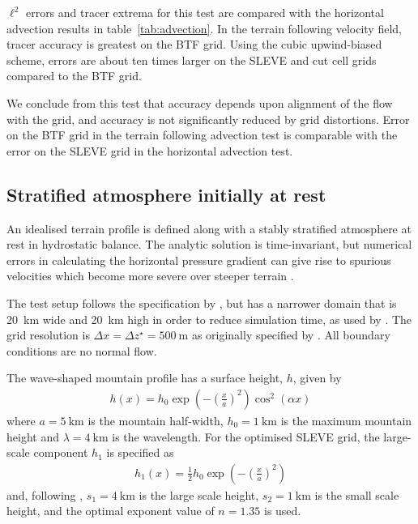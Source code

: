 \documentclass[twocol]{ametsoc}
\begin{document}
$\ell^2$ errors and tracer extrema for this test are compared with the horizontal advection results in table~\ref{tab:advection}.  In the terrain following velocity field, tracer accuracy is greatest on the BTF grid.  Using the cubic upwind-biased scheme, errors are about ten times larger on the SLEVE and cut cell grids compared to the BTF grid.

We conclude from this test that accuracy depends upon alignment of the flow with the grid, and accuracy is not significantly reduced by grid distortions.  Error on the BTF grid in the terrain following advection test is comparable with the error on the SLEVE grid in the horizontal advection test.

\subsection{Stratified atmosphere initially at rest}
\label{sec:resting}

An idealised terrain profile is defined along with a stably stratified atmosphere at rest in hydrostatic balance.  The analytic solution is time-invariant, but numerical errors in calculating the horizontal pressure gradient can give rise to spurious velocities which become more severe over steeper terrain \citep{klemp2011}.

The test setup follows the specification by \cite{klemp2011}, but has a narrower domain that is \SI{20}{\kilo\meter} wide and \SI{20}{\kilo\meter} high in order to reduce simulation time, as used by \citet{weller-shahrokhi2014}.  The grid resolution is \(\Delta x = \Delta z^\star = \SI{500}{\meter}\) as originally specified by \citet{klemp2011}.  All boundary conditions are no normal flow.

The wave-shaped mountain profile has a surface height, $h$, given by
\begin{align}
	h(x) = h_0 \exp \left( - \left( \frac{x}{a} \right)^2 \right) \cos^2 \left( \alpha x \right) \label{eqn:resting:mountain}
\end{align}
where $a = \SI{5}{\kilo\meter}$ is the mountain half-width, $h_0 = \SI{1}{\kilo\meter}$ is the maximum mountain height and $\lambda = \SI{4}{\kilo\meter}$ is the wavelength.  For the optimised SLEVE grid, the large-scale component $h_1$ is specified as
\begin{align}
h_1(x) = \frac{1}{2} h_0 \exp \left( - \left( \frac{x}{a} \right)^2 \right)
\end{align}
and, following \cite{leuenberger2010}, $s_1 = \SI{4}{\kilo\meter}$ is the large scale height, $s_2 = \SI{1}{\kilo\meter}$ is the small scale height, and the optimal exponent value of $n = 1.35$ is used.
\end{document}
